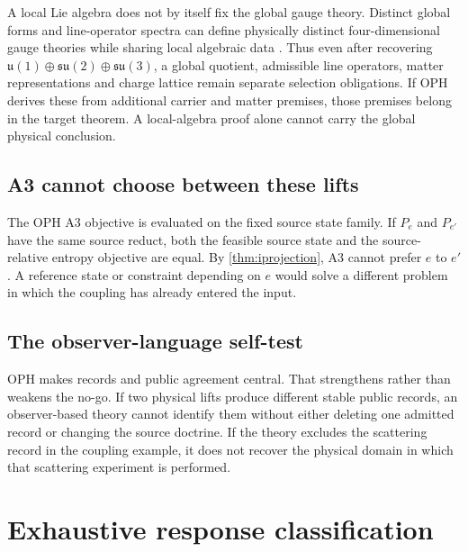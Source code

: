 \documentclass[10pt,a4paper]{article}
\theoremstyle{definition}
\theoremstyle{remark}
\begin{document}
A local Lie algebra does not by itself fix the global gauge theory.  Distinct
global forms and line-operator spectra can define physically distinct
four-dimensional gauge theories while sharing local algebraic data
\cite{AharonySeibergTachikawa}.  Thus even after recovering
\(\mathfrak u(1)\oplus\mathfrak{su}(2)\oplus\mathfrak{su}(3)\), a global
quotient, admissible line operators, matter representations and charge lattice
remain separate selection obligations.  If OPH derives these from additional
carrier and matter premises, those premises belong in the target theorem.  A
local-algebra proof alone cannot carry the global physical conclusion.

\subsection{A3 cannot choose between these lifts}

The OPH A3 objective is evaluated on the fixed source state family.  If
\(P_e\) and \(P_{e'}\) have the same source reduct, both the feasible source
state and the source-relative entropy objective are equal.  By
\cref{thm:iprojection}, A3 cannot prefer \(e\) to \(e'\).  A reference state or
constraint depending on \(e\) would solve a different problem in which the
coupling has already entered the input.

\subsection{The observer-language self-test}

OPH makes records and public agreement central.  That strengthens rather than
weakens the no-go.  If two physical lifts produce different stable public
records, an observer-based theory cannot identify them without either deleting
one admitted record or changing the source doctrine.  If the theory excludes
the scattering record in the coupling example, it does not recover the
physical domain in which that scattering experiment is performed.

\section{Exhaustive response classification}
\label{sec:responses}
\end{document}
